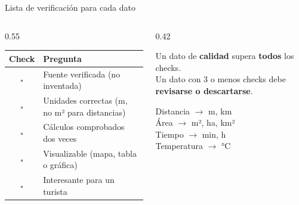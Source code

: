 \documentclass[aspectratio=169, 10pt, spanish]{beamer}
\begin{document}
\begin{frame}{Lista de verificación para cada dato}
  \begin{columns}[c]
    \begin{column}{0.55\textwidth}
      \renewcommand{\arraystretch}{1.4}
      \begin{tabular}{|c|p{6.5cm}|}
        \hline
        \rowcolor{AlmAzul!15}
        \textbf{Check} & \textbf{Pregunta} \\
        \hline
        $\square$ & Fuente verificada (no inventada) \\
        $\square$ & Unidades correctas (m, no m² para distancias) \\
        $\square$ & Cálculos comprobados dos veces \\
        $\square$ & Visualizable (mapa, tabla o gráfica) \\
        $\square$ & Interesante para un turista \\
        \hline
      \end{tabular}
    \end{column}
    \begin{column}{0.42\textwidth}
      \begin{notabox}
        Un dato de \textbf{calidad} supera \textbf{todos} los checks.\\[6pt]
        Un dato con 3 o menos checks debe \textbf{revisarse o descartarse}.
      \end{notabox}
      \vspace{0.2cm}
      \begin{notabox}[Unidades]
        Distancia $\to$ m, km\\
        Área $\to$ m², ha, km²\\
        Tiempo $\to$ min, h\\
        Temperatura $\to$ °C
      \end{notabox}
    \end{column}
  \end{columns}
\end{frame}
\end{document}
